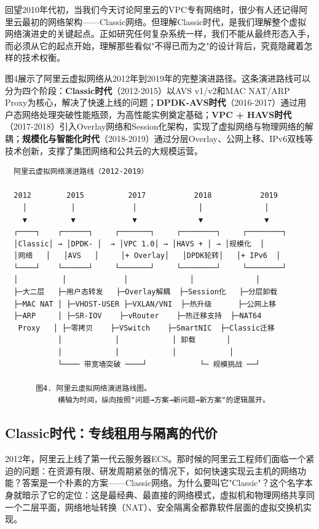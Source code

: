 回望2010年代初，当我们今天讨论阿里云的VPC专有网络时，很少有人还记得阿里云最初的网络架构——Classic网络。但理解Classic时代，是我们理解整个虚拟网络演进史的关键起点。正如研究任何复杂系统一样，我们不能从最终形态入手，而必须从它的起点开始，理解那些看似"不得已而为之"的设计背后，究竟隐藏着怎样的技术权衡。

图4展示了阿里云虚拟网络从2012年到2019年的完整演进路径。这条演进路线可以分为四个阶段：\textbf{Classic时代}（2012-2015）以AVS v1/v2和MAC NAT/ARP Proxy为核心，解决了快速上线的问题；\textbf{DPDK-AVS时代}（2016-2017）通过用户态网络处理突破性能瓶颈，为高性能实例奠定基础；\textbf{VPC + HAVS时代}（2017-2018）引入Overlay网络和Session化架构，实现了虚拟网络与物理网络的解耦；\textbf{规模化与智能化时代}（2018-2019）通过分层Overlay、公网上移、IPv6双栈等技术创新，支撑了集团网络和公共云的大规模运营。

\begin{verbatim}
  阿里云虚拟网络演进路线（2012-2019）

  2012        2015          2017           2018           2019
    │          │             │              │              │
    ▼          ▼             ▼              ▼              ▼
  ┌────┐    ┌──────┐     ┌───────┐     ┌────────┐     ┌────────┐
  │Classic│ → │DPDK- │  → │VPC 1.0│ → │HAVS + │ → │规模化  │
  │网络   │   │AVS   │     │+ Overlay│   │DPDK轮转│   │+ IPv6  │
  └────┘    └──────┘     └───────┘     └────────┘     └────────┘
  │          │             │              │              │
  ├─大二层   ├─用户态转发   ├─Overlay解耦  ├─Session化   ├─分层卸载
  ├─MAC NAT │ ├─VHOST-USER ├─VXLAN/VNI  ├─热升级      ├─公网上移
  ├─ARP     │ ├─SR-IOV    ├─vRouter    ├─热迁移支持  ├─NAT64
   Proxy   │ ├─零拷贝    ├─VSwitch    ├─SmartNIC  ├─Classic迁移
            │            │            │ 卸载       │
            │            │            │            │
            └──── 带宽墙突破 ────┘            └─ 规模挑战 ──┘

       图4. 阿里云虚拟网络演进路线图。
            横轴为时间，纵向按照"问题→方案→新问题→新方案"的逻辑展开。
\end{verbatim}

\subsection{Classic时代：专线租用与隔离的代价}

2012年，阿里云上线了第一代云服务器ECS。那时候的阿里云工程师们面临一个紧迫的问题：在资源有限、研发周期紧张的情况下，如何快速实现云主机的网络功能？答案是一个朴素的方案——Classic网络。为什么要叫它"Classic"？这个名字本身就暗示了它的定位：这是最经典、最直接的网络模式，虚拟机和物理网络共享同一个二层平面，网络地址转换（NAT）、安全隔离全都靠软件层面的虚拟交换机实现。

